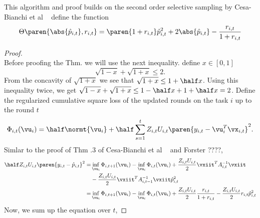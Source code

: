 This algorithm and proof builds on the second order selective sampling by Cesa-Bianchi 
et al ~\cite{cesa2006worst} define the function
\begin{equation}
\Theta\paren{\abs{\hat{p}_{i,t}},r_{i,t}}=\paren{1+r_{i,t}}\hat{p}_{i,t}^2+2\abs{\hat{p}_{i,t}}-\frac{r_{i,t}}{1+r_{i,t}}
\end{equation}


\begin{proof} 
\\ 
Before proofing the Thm. we will use the next inequality. define $x\in[0,1]$
\begin{equation}
\sqrt{1-x}+\sqrt{1+x}\le2.
\label{technical_inequality}
\end{equation}
From the concavity of $\sqrt{1+x}$ we see that $\sqrt{1+x}\le1+\half x$. 
Using this inequality twice, we get $\sqrt{1-x}+\sqrt{1+x}\le1-\half x+1+\half x=2$.
Define the regularized cumulative square loss of the updated rounds on the task 
$i$ up to the round $t$
\begin{equation*}
\Phi_{i,t}(\vu_i)=\half\normt{\vu_i}+\half\sum_{s=1}^{t}{Z_{i,t}U_{i,t}\paren{y_{i,t}-\vu_i^T\vx_{i,t}}}^2.
\end{equation*}
Simlar to the proof of Thm .3 of Cesa-Bianchi et al ~\cite{cesa2006worst} and Forster ????,
\begin{equation*}
\begin{split}
\half Z_{i,t}U_{i,t}\paren{y_{i,t}-\hat{p}_{i,t}}^{2}= &\inf_{\vu_i}{\Phi_{i,t+1}}(\vu_i)-\inf_{\vu_i}{\Phi_{i,t}}(\vu_i)+\frac{Z_{i,t}U_{i,t}}{2}\vxiit^TA_{i,t}^{-1}\vxiit\\
&-\frac{Z_{i,t}U_{i,t}}{2}\vxiit^TA_{i,t-1}^{-1}\vxiit\hat{p}_{i,t}^2\\
=&\inf_{\vu_i}{\Phi_{i,t+1}}(\vu_i)-\inf_{\vu_i}{\Phi_{i,t}}(\vu_i)+\frac{Z_{i,t}U_{i,t}}{2}\frac{r_{i,t}}{1+r_{i,t}}-\frac{Z_{i,t}U_{i,t}}{2}r_{i,t}\hat{p}_{i,t}^2
\end{split}
\end{equation*} 
Now, we sum up the equation over $t$,
 

\end{proof}
